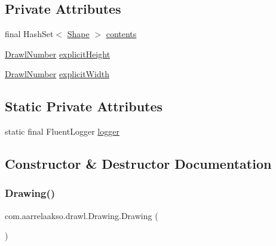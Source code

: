 \subsection*{Private Attributes}
\begin{DoxyCompactItemize}
\item 
final Hash\+Set$<$ \hyperlink{classcom_1_1aarrelaakso_1_1drawl_1_1_shape}{Shape} $>$ \hyperlink{classcom_1_1aarrelaakso_1_1drawl_1_1_drawing_ab9ec6030e9f21d42852b308c482b3ccf}{contents}
\item 
\hyperlink{classcom_1_1aarrelaakso_1_1drawl_1_1_drawl_number}{Drawl\+Number} \hyperlink{classcom_1_1aarrelaakso_1_1drawl_1_1_drawing_a4a0d4d3e176d56acbdae698a827271fc}{explicit\+Height}
\item 
\hyperlink{classcom_1_1aarrelaakso_1_1drawl_1_1_drawl_number}{Drawl\+Number} \hyperlink{classcom_1_1aarrelaakso_1_1drawl_1_1_drawing_ab6cf5047fe1a446a083c53a059332c27}{explicit\+Width}
\end{DoxyCompactItemize}
\subsection*{Static Private Attributes}
\begin{DoxyCompactItemize}
\item 
static final Fluent\+Logger \hyperlink{classcom_1_1aarrelaakso_1_1drawl_1_1_drawing_a9ca07608ceeb04d747e114cd1a82a3f9}{logger}
\end{DoxyCompactItemize}


\subsection{Constructor \& Destructor Documentation}
\mbox{\label{classcom_1_1aarrelaakso_1_1drawl_1_1_drawing_adc398fbdb9acaa2c09ab8f048ff45109}} 
\subsubsection{\texorpdfstring{Drawing()}{Drawing()}}
{\footnotesize\ttfamily com.\+aarrelaakso.\+drawl.\+Drawing.\+Drawing (\begin{DoxyParamCaption}{ }\end{DoxyParamCaption})}



